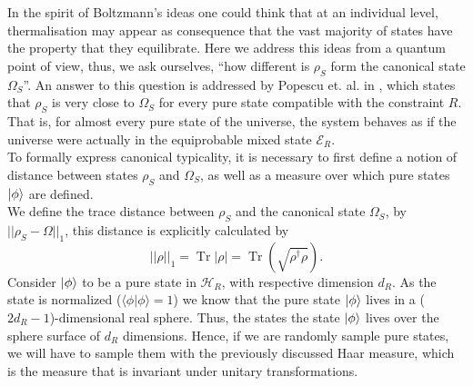 In the spirit of Boltzmann's ideas one could think that at an individual level, thermalisation may appear as consequence that the vast majority of states have the property that they equilibrate. Here we address this ideas from a quantum point of view, thus, we ask ourselves, ``how different is $\rho_S$ form the canonical state $\Omega_S$''. An answer to this question is addressed by Popescu et. al. in \cite{popescu_entanglement_2006,popescu_foundations_2005}, which states that $\rho_S$ is very close to $\Omega_S$ for every pure state compatible with the constraint $R$. That is, for almost every pure state of the universe, the system behaves as if the universe were actually in the equiprobable mixed state $\mathcal{E}_R$. \\
\indent To formally express canonical typicality, it is necessary to first define a notion of distance between states $\rho_S$ and $\Omega_S$, as well as a measure over which pure states $\mathinner{|{\phi}\rangle}$ are defined.\\
\indent We define the trace distance between $\rho_S$ and the canonical state $\Omega_S$, by  $||\rho_S-\Omega||_1$, this distance is explicitly calculated by
\begin{equation}
||\rho||_1=\operatorname{Tr}|\rho|=\operatorname{Tr}\left(\sqrt{\rho^{\dagger} \rho}\right).
\label{CH1:Trace_distance}
\end{equation}
Consider $\mathinner{|{\phi}\rangle}$ to be a pure state in $\mathcal{H}_R$, with respective dimension $d_R$. As the state is normalized ($\langle\phi | \phi\rangle=1$) we know that the pure state $\mathinner{|{\phi}\rangle}$ lives in a ($2d_R-1$)-dimensional real sphere. Thus, the states the state $\mathinner{|{\phi}\rangle}$ lives over the sphere surface of $d_R$ dimensions. Hence, if we are randomly sample pure states, we will have to sample them with the previously discussed Haar measure, which is the measure that is invariant under unitary transformations.\\
